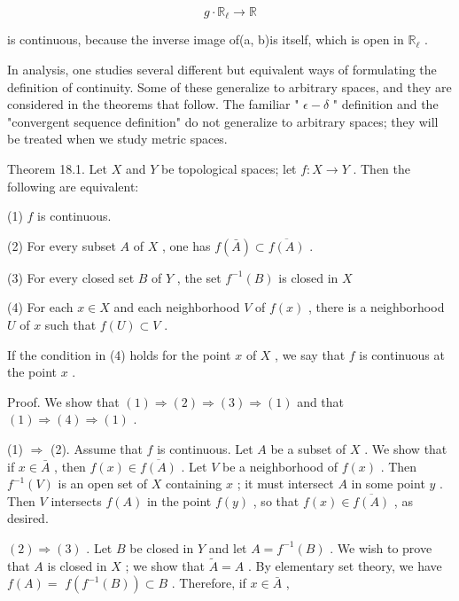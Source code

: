 \[
g \cdot  {\mathbb{R}}_{\ell } \rightarrow  \mathbb{R}
\]

is continuous, because the inverse image of(a, b)is itself, which is open in \({\mathbb{R}}_{\ell }\) .

In analysis, one studies several different but equivalent ways of formulating the definition of continuity. Some of these generalize to arbitrary spaces, and they are considered in the theorems that follow. The familiar " \(\epsilon  - \delta\) " definition and the "convergent sequence definition" do not generalize to arbitrary spaces; they will be treated when we study metric spaces.

Theorem 18.1. Let \(X\) and \(Y\) be topological spaces; let \(f : X \rightarrow  Y\) . Then the following are equivalent:

(1) \(f\) is continuous.

(2) For every subset \(A\) of \(X\) , one has \(f\left( \bar{A}\right)  \subset  \overline{f\left( A\right) }\) .

(3) For every closed set \(B\) of \(Y\) , the set \({f}^{-1}\left( B\right)\) is closed in \(X\)

(4) For each \(x \in  X\) and each neighborhood \(V\) of \(f\left( x\right)\) , there is a neighborhood \(U\) of \(x\) such that \(f\left( U\right)  \subset  V\) .

If the condition in (4) holds for the point \(x\) of \(X\) , we say that \(f\) is continuous at the point \(x\) .

Proof. We show that \(\left( 1\right)  \Rightarrow  \left( 2\right)  \Rightarrow  \left( 3\right)  \Rightarrow  \left( 1\right)\) and that \(\left( 1\right)  \Rightarrow  \left( 4\right)  \Rightarrow  \left( 1\right)\) .

(1) \(\Rightarrow\) (2). Assume that \(f\) is continuous. Let \(A\) be a subset of \(X\) . We show that if \(x \in  \bar{A}\) , then \(f\left( x\right)  \in  \overline{f\left( A\right) }\) . Let \(V\) be a neighborhood of \(f\left( x\right)\) . Then \({f}^{-1}\left( V\right)\) is an open set of \(X\) containing \(x\) ; it must intersect \(A\) in some point \(y\) . Then \(V\) intersects \(f\left( A\right)\) in the point \(f\left( y\right)\) , so that \(f\left( x\right)  \in  \overline{f\left( A\right) }\) , as desired.

\(\left( 2\right)  \Rightarrow  \left( 3\right)\) . Let \(B\) be closed in \(Y\) and let \(A = {f}^{-1}\left( B\right)\) . We wish to prove that \(A\) is closed in \(X\) ; we show that \(\widetilde{A} = A\) . By elementary set theory, we have \(f\left( A\right)  =\)  \(f\left( {{f}^{-1}\left( B\right) }\right)  \subset  B\) . Therefore, if \(x \in  \bar{A}\) ,

